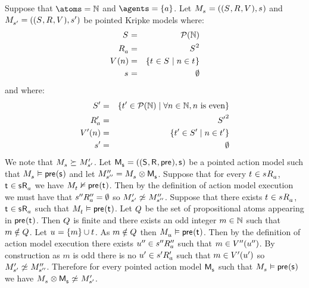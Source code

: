 \begin{example}
Suppose that $\atoms = \naturals$ and $\agents = \{\agentA\}$.
Let $\kPModelAndTuple{\kStateS}$ and $\kPModelAndTuple{\kStateSP}$ be pointed Kripke models where:
\begin{eqnarray*}
    \kStates &=& \powerset(\naturals)\\
    \kAccessibilityA &=& \kStates^2\\
    \kValuation(n) &=& \{\kStateT \in \kStates \mid n \in \kStateT\}\\
    \kStateS &=& \emptyset
\end{eqnarray*}
and where:
\begin{eqnarray*}
    {S^{\prime}} &=& \{{t}^{\prime} \in \mathcal{P}(\mathbb{N}) \mid \forall n \in \mathbb{N}, n \text{ is even}\}\\
    {R^{\prime}_{a}} &=& {S^{\prime}}^2\\
    {V^{\prime}}(n) &=& \{{t}^{\prime} \in {S^{\prime}} \mid n \in {t}^{\prime}\}\\
    {s}^{\prime} &=& \emptyset
\end{eqnarray*}
We note that $\kPModel{\kStateS} \simulates \kPModelP{\kStateSP}$.
Let $\aPModelAndTuple{\aStateS}$ be a pointed action model such that $\kPModel{\kStateS} \entails \aPrecondition(\aStateS)$ and let $\kPModelPP{\kStateSPP} = \kPModel{\kStateS} \exec \aPModel{\aStateS}$.
Suppose that for every $\kStateT \in \kSuccessorsA{\kStateS}$, $\aStateT \in \aSuccessorsA{\aStateS}$ we have $\kPModel{\kStateT} \nentails \aPrecondition(\aStateT)$.
Then by the definition of action model execution we must have that ${{s}^{\prime\prime}} {R^{\prime\prime}_{a}} = \emptyset$ so $\kPModelP{\kStateSP} \not\bisimilar \kPModelPP{\kStateSPP}$.
Suppose that there exists $\kStateT \in \kSuccessorsA{\kStateS}$, $\aStateT \in \aSuccessorsA{\aStateS}$ such that $\kPModel{\kStateT} \entails \aPrecondition(\aStateT)$.
Let $Q$ be the set of propositional atoms appearing in $\aPrecondition(\aStateT)$.
Then $Q$ is finite and there exists an odd integer $m \in \mathbb{N}$ such that $m \notin Q$.
Let $\kStateU = \{m\} \cup \kStateT$.
As $m \notin Q$ then $\kPModel{\kStateU} \entails \aPrecondition(\aStateT)$.
Then by the definition of action model execution there exists ${u}^{\prime\prime} \in {{s}^{\prime\prime}} {R^{\prime\prime}_{a}}$ such that $m \in {V^{\prime\prime}}({u}^{\prime\prime})$.
By construction as $m$ is odd there is no ${u}^{\prime} \in {{s}^{\prime}} {R^{\prime}_{a}}$ such that $m \in {V^{\prime}}({u}^{\prime})$ so $\kPModelP{\kStateSP} \not\bisimilar \kPModelPP{\kStateSPP}$.
Therefore for every pointed action model $\aPModel{\aStateS}$ such that $\kPModel{\kStateS} \entails \aPrecondition(\aStateS)$ we have $\kPModel{\kStateS} \exec \aPModel{\aStateS} \not\bisimilar \kPModelP{\kStateSP}$.
\end{example}

